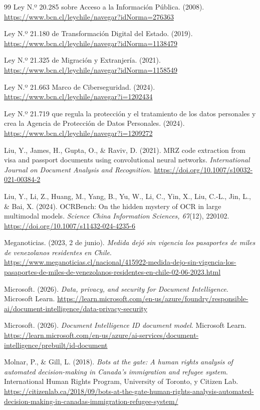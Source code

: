 \documentclass[11pt,a4paper]{article}
\begin{document}
\begin{thebibliography}{99}
Ley N.º 20.285 sobre Acceso a la Información Pública. (2008). \url{https://www.bcn.cl/leychile/navegar?idNorma=276363}

Ley N.º 21.180 de Transformación Digital del Estado. (2019). \url{https://www.bcn.cl/leychile/navegar?idNorma=1138479}

Ley N.º 21.325 de Migración y Extranjería. (2021). \url{https://www.bcn.cl/leychile/navegar?idNorma=1158549}

Ley N.º 21.663 Marco de Ciberseguridad. (2024). \url{https://www.bcn.cl/leychile/navegar?i=1202434}

Ley N.º 21.719 que regula la protección y el tratamiento de los datos personales y crea la Agencia de Protección de Datos Personales. (2024). \url{https://www.bcn.cl/leychile/navegar?i=1209272}

Liu, Y., James, H., Gupta, O., \& Raviv, D. (2021). MRZ code extraction from visa and passport documents using convolutional neural networks. \emph{International Journal on Document Analysis and Recognition}. \url{https://doi.org/10.1007/s10032-021-00384-2}

Liu, Y., Li, Z., Huang, M., Yang, B., Yu, W., Li, C., Yin, X., Liu, C.-L., Jin, L., \& Bai, X. (2024). OCRBench: On the hidden mystery of OCR in large multimodal models. \emph{Science China Information Sciences, 67}(12), 220102. \url{https://doi.org/10.1007/s11432-024-4235-6}

Meganoticias. (2023, 2 de junio). \emph{Medida dejó sin vigencia los pasaportes de miles de venezolanos residentes en Chile}. \url{https://www.meganoticias.cl/nacional/415922-medida-dejo-sin-vigencia-los-pasaportes-de-miles-de-venezolanos-residentes-en-chile-02-06-2023.html}

Microsoft. (2026). \emph{Data, privacy, and security for Document Intelligence}. Microsoft Learn. \url{https://learn.microsoft.com/en-us/azure/foundry/responsible-ai/document-intelligence/data-privacy-security}

Microsoft. (2026). \emph{Document Intelligence ID document model}. Microsoft Learn. \url{https://learn.microsoft.com/en-us/azure/ai-services/document-intelligence/prebuilt/id-document}

Molnar, P., \& Gill, L. (2018). \emph{Bots at the gate: A human rights analysis of automated decision-making in Canada's immigration and refugee system}. International Human Rights Program, University of Toronto, y Citizen Lab. \url{https://citizenlab.ca/2018/09/bots-at-the-gate-human-rights-analysis-automated-decision-making-in-canadas-immigration-refugee-system/}


\end{thebibliography}
\end{document}
